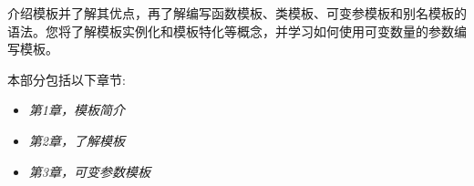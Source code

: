 介绍模板并了解其优点，再了解编写函数模板、类模板、可变参模板和别名模板的语法。您将了解模板实例化和模板特化等概念，并学习如何使用可变数量的参数编写模板。

本部分包括以下章节:

\begin{itemize}
\item
\textit{第1章，模板简介}

\item
\textit{第2章，了解模板}

\item
\textit{第3章，可变参数模板}
\end{itemize}